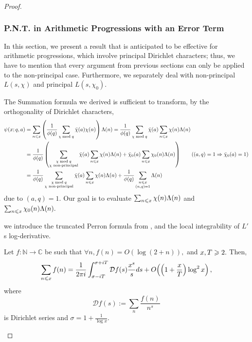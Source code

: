 \begin{proof}
\subsubsection{P.N.T. in Arithmetic Progressions with an Error Term}
In this section, we present a result that is anticipated to be effective for arithmetic progressions, which involve principal Dirichlet characters; thus, we have to mention that every argument from previous sections can only be applied to the non-principal case. Furthermore, we separately deal with non-principal $L(s, \chi)$ and principal $L(s, \chi_0).$

The Summation formula we derived is sufficient to transform, by the orthogonality of Dirichlet characters, 
\begin{align*}
    \psi(x; q, a) &= \sum_{n \leqslant x} \left( \frac{1}{\phi(q)} \sum_{\chi \bmod q} \bar{\chi}(a) \chi(n) \right) \Lambda(n) = \frac{1}{\phi(q)} \sum_{\chi \bmod q} \bar{\chi}(a) \sum_{n \leqslant x} \chi(n) \Lambda(n) \\
    &= \frac{1}{\phi(q)} \left( \sum_{\substack{\chi \bmod q \\ \chi \text{ non-principal}}} \bar{\chi}(a) \sum_{n \leqslant x} \chi(n) \Lambda(n) + \bar{\chi}_0(a) \sum_{n \leqslant x} \chi_0(n) \Lambda(n) \right) \qquad ((a, q) = 1 \Rightarrow \bar{\chi}_0(a) = 1) \\
    &= \frac{1}{\phi(q)} \sum_{\substack{\chi \bmod q \\ \chi \text{ non-principal}}} \bar{\chi}(a) \sum_{n \leqslant x} \chi(n) \Lambda(n) + \frac{1}{\phi(q)} \sum_{\substack{n \leqslant x \\ (n, q) = 1}} \Lambda(n)
\end{align*}
due to $(a, q) = 1.$ Our goal is to evaluate $\sum_{n \leqslant x} \chi(n) \Lambda(n)$ and $\sum_{n \leqslant x} \chi_0(n) \Lambda(n).$

we introduce the truncated Perron formula from \cite[Proposition 12]{Tao254ANotes2}, and the local integrability of $L'$s log-derivative.
\begin{lemma}
    Let $f: \mathbb{N} \rightarrow \mathbb{C}$ be such that $\forall n, f(n) = O(\log(2+n)),$ and $x, T \geqslant 2.$ Then, $$\sum_{n \leqslant x} f(n) = \frac{1}{2 \pi i} \int_{\sigma - iT}^{\sigma + iT} \mathcal{D}f(s) \frac{x^s}{s}ds + O\! \left( \left( 1+\frac{x}{T} \right) \log^2 x \right),$$ where $$\mathcal{D}f(s) := \sum_n \frac{f(n)}{n^s}$$ is Dirichlet series and $\sigma = 1 + \frac{1}{\log x}.$
\end{lemma}


\end{proof}
